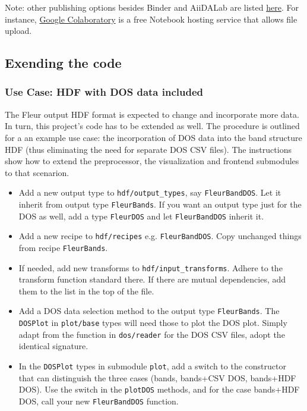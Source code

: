 \documentclass[]{article}
\providecommand{\tightlist}{%
  \setlength{\itemsep}{0pt}\setlength{\parskip}{0pt}}
\begin{document}
Note: other publishing options besides Binder and AiiDALab are listed
\href{https://github.com/markusschanta/awesome-jupyter}{here}. For
instance, \href{http://colab.research.google.com/}{Google Colaboratory}
is a free Notebook hosting service that allows file upload.

\subsection{Exending the code}\label{exending-the-code}

\subsubsection{Use Case: HDF with DOS data
included}\label{use-case-hdf-with-dos-data-included}

The Fleur output HDF format is expected to change and incorporate more
data. In turn, this project's code has to be extended as well. The
procedure is outlined for a an example use case: the incorporation of
DOS data into the band structure HDF (thus eliminating the need for
separate DOS CSV files). The instructions show how to extend the
preprocessor, the visualization and frontend submodules to that
scenarion.

\begin{itemize}
\tightlist
\item
  Add a new output type to \texttt{hdf/output\_types}, say
  \texttt{FleurBandDOS}. Let it inherit from output type
  \texttt{FleurBands}. If you want an output type just for the DOS as
  well, add a type \texttt{FleurDOS} and let \texttt{FleurBandDOS}
  inherit it.
\item
  Add a new recipe to \texttt{hdf/recipes} e.g. \texttt{FleurBandDOS}.
  Copy unchanged things from recipe \texttt{FleurBands}.
\item
  If needed, add new transforms to \texttt{hdf/input\_transforms}.
  Adhere to the transform function standard there. If there are mutual
  dependencies, add them to the list in the top of the file.
\item
  Add a DOS data selection method to the output type
  \texttt{FleurBands}. The \texttt{DOSPlot} in \texttt{plot/base} types
  will need those to plot the DOS plot. Simply adapt from the function
  in \texttt{dos/reader} for the DOS CSV files, adopt the identical
  signature.
\item
  In the \texttt{DOSPlot} types in submodule \texttt{plot}, add a switch
  to the constructor that can distinguish the three cases (bands,
  bands+CSV DOS, bands+HDF DOS). Use the switch in the \texttt{plotDOS}
  methods, and for the case bands+HDF DOS, call your new
  \texttt{FleurBandDOS} function.
\end{itemize}
\end{document}
